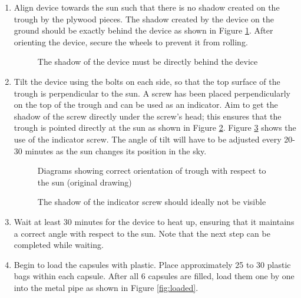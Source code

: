 \documentclass[11pt,english]{article}
\begin{document}
 
\begin{enumerate}
\item Align device towards the sun such that there is no shadow created on the trough by the plywood pieces. The shadow created by the device on the ground should be exactly behind the device as shown in Figure \ref{fig:align}. After orienting the device, secure the wheels to prevent it from rolling. 

\begin{figure}[ht!]%
    \centering
    \qquad
    \caption{The shadow of the device must be directly behind the device}%
    \label{fig:align}%
\end{figure}
\newpage
\item Tilt the device using the bolts on each side, so that the top surface of the trough is perpendicular to the sun. A screw has been placed perpendicularly on the top of the trough and can be used as an indicator. Aim to get the shadow of the screw directly under the screw's head; this ensures that the trough is pointed directly at the sun as shown in Figure \ref{fig:orientationtrough}. Figure \ref{fig:indicator_nail} shows the use of the indicator screw. The angle of tilt will have to be adjusted every 20-30 minutes as the sun changes its position in the sky.

\begin{figure}[ht!]%
    \centering
    \qquad
    \caption{Diagrams showing correct orientation of trough with respect to the sun (original drawing) }%
    \label{fig:orientationtrough}%
\end{figure}

\begin{figure}[ht!]%
    \centering
    \qquad
    \caption{The shadow of the indicator screw should ideally not be visible }%
    \label{fig:indicator_nail}%
\end{figure}
\newpage
\item Wait at least 30 minutes for the device to heat up, ensuring that it maintains a correct angle with respect to the sun. Note that the next step can be completed while waiting.
\item Begin to load the capsules with plastic. Place approximately 25 to 30 plastic bags within each capsule. After all 6 capsules are filled, load them one by one into the metal pipe as shown in Figure \ref{fig:loaded}.


\end{enumerate}
\end{document}
